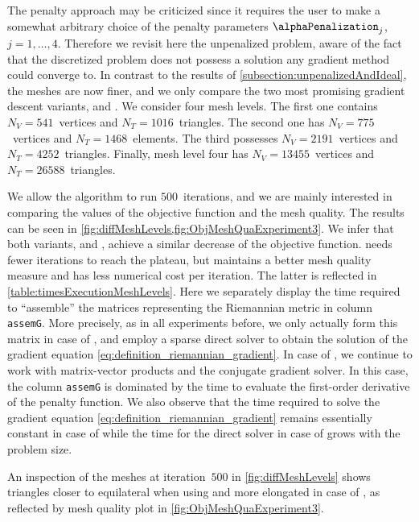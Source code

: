 The penalty approach may be criticized since it requires the user to make a somewhat arbitrary choice of the penalty parameters $\alphaPenalization_j$, $j = 1, \ldots, 4$.
Therefore we revisit here the unpenalized problem, aware of the fact that the discretized problem does not possess a solution any gradient method could converge to.
In contrast to the results of \cref{subsection:unpenalizedAndIdeal}, the meshes are now finer, and we only compare the two most promising gradient descent variants, \ElasEuc and \CompEuc.
We consider four mesh levels.
The first one contains $N_V = 541$~vertices and $N_T = 1016$~triangles.
The second one has $N_V = 775$~vertices and $N_T = 1468$~elements.
The third possesses $N_V = 2191$~vertices and $N_T = 4252$~triangles.
Finally, mesh level four has $N_V = 13455$~vertices and $N_T = 26588$~triangles.


We allow the algorithm to run $500$~iterations, and we are mainly interested in comparing the values of the objective function and the mesh quality.
The results can be seen in \cref{fig:diffMeshLevels,fig:ObjMeshQuaExperiment3}.
We infer that both variants, \ElasEuc and \CompEuc, achieve a similar decrease of the objective function.
\ElasEuc needs fewer iterations to reach the plateau, but \CompEuc maintains a better mesh quality measure and has less numerical cost per iteration.
The latter is reflected in \cref{table:timesExecutionMeshLevels}.
Here we separately display the time required to \enquote{assemble} the matrices representing the Riemannian metric in column \texttt{assemG}.
More precisely, as in all experiments before, we only actually form this matrix in case of \ElasEuc, and employ a sparse direct solver to obtain the solution of the gradient equation \eqref{eq:definition_riemannian_gradient}.
In case of \CompEuc, we continue to work with matrix-vector products and the conjugate gradient solver.
In this case, the column \texttt{assemG} is dominated by the time to evaluate the first-order derivative of the penalty function.
We also observe that the time required to solve the gradient equation \eqref{eq:definition_riemannian_gradient} remains essentially constant in case of \CompEuc while the time for the direct solver in case of \ElasEuc grows with the problem size.

An inspection of the meshes at iteration~$500$ in \cref{fig:diffMeshLevels} shows triangles closer to equilateral when using \CompEuc and more elongated in case of \ElasEuc, as reflected by mesh quality plot in \cref{fig:ObjMeshQuaExperiment3}.

